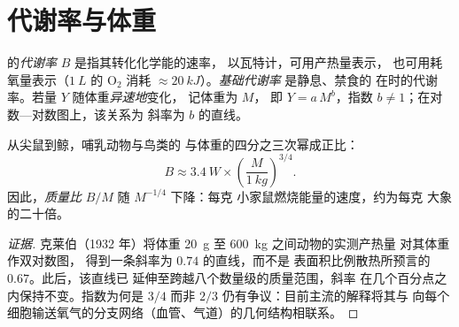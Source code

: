 \section{代谢率与体重}

\begin{definition}\label{def:b1:organism-environment:allometry}
的\emph{代谢率} $B$ 是指其转化化学能的速率，
以瓦特计，可用产热量表示，
也可用耗氧量表示（$\qty{1}{L}$ 的 $\mathrm{O_2}$
消耗 $\approx \qty{20}{kJ}$）。\emph{基础代谢率}
是静息、禁食的
在时的代谢率。若量 $Y$ 随体重\emph{异速地}变化，
记体重为 $M$，
即 $Y = a\,M^{b}$，指数 $b \neq 1$；在对数—对数图上，该关系为
斜率为 $b$ 的直线。
\end{definition}

\begin{theorem}[克莱伯定律]\label{thm:b1:organism-environment:kleiber}
从尖鼠到鲸，哺乳动物与鸟类的
与体重的四分之三次幂成正比：
\[
B \approx \qty{3.4}{W}\times\left(\frac{M}{\qty{1}{kg}}\right)^{3/4}.
\]
因此，\emph{质量比} $B/M$ 随 $M^{-1/4}$ 下降：每克
小家鼠燃烧能量的速度，约为每克
大象的二十倍。
\end{theorem}
\begin{proof}[证据]
克莱伯（1932 年）将体重 \qty{20}{g} 至 \qty{600}{kg} 之间动物的实测产热量
对其体重作双对数图，
得到一条斜率为 $0.74$ 的直线，而不是
表面积比例散热所预言的 $0.67$。此后，该直线已
延伸至跨越八个数量级的质量范围，斜率
在几个百分点之内保持不变。指数为何是 $3/4$ 而非 $2/3$
仍有争议：目前主流的解释将其与
向每个细胞输送氧气的分支网络（血管、气道）的几何结构相联系。
\end{proof}

